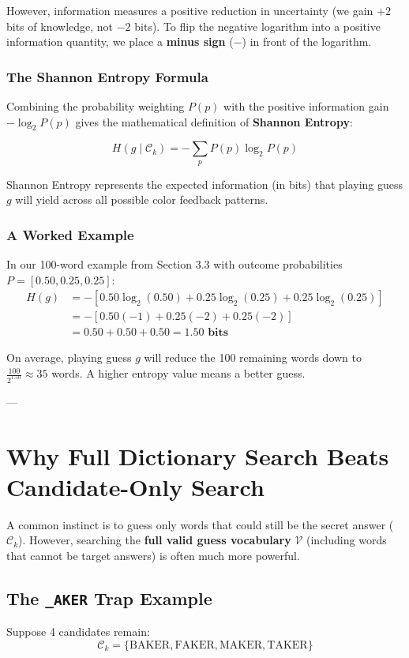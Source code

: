 \documentclass[11pt,a4paper]{article}
\begin{document}
However, information measures a positive reduction in uncertainty (we gain $+2$ bits of knowledge, not $-2$ bits). To flip the negative logarithm into a positive information quantity, we place a \textbf{minus sign} ($-$) in front of the logarithm.

\subsubsection*{The Shannon Entropy Formula}
Combining the probability weighting $P(p)$ with the positive information gain $-\log_2 P(p)$ gives the mathematical definition of \textbf{Shannon Entropy}:

\begin{equation}
H(g \mid \mathcal{C}_k) = -\sum_{p} P(p) \log_2 P(p)
\end{equation}

Shannon Entropy represents the expected information (in bits) that playing guess $g$ will yield across all possible color feedback patterns.

\subsubsection*{A Worked Example}
In our 100-word example from Section 3.3 with outcome probabilities $P = [0.50, 0.25, 0.25]$:
\begin{align*}
H(g) &= - \left[ 0.50 \log_2(0.50) + 0.25 \log_2(0.25) + 0.25 \log_2(0.25) \right] \\
&= - \left[ 0.50(-1) + 0.25(-2) + 0.25(-2) \right] \\
&= 0.50 + 0.50 + 0.50 = \mathbf{1.50 \text{ bits}}
\end{align*}

On average, playing guess $g$ will reduce the 100 remaining words down to $\frac{100}{2^{1.50}} \approx 35$ words. A higher entropy value means a better guess.

---

\section{Why Full Dictionary Search Beats Candidate-Only Search}

A common instinct is to guess only words that could still be the secret answer ($\mathcal{C}_k$). However, searching the \textbf{full valid guess vocabulary} $\mathcal{V}$ (including words that cannot be target answers) is often much more powerful.

\subsection{The \texttt{\_AKER} Trap Example}
Suppose 4 candidates remain:
$$\mathcal{C}_k = \{ \text{BAKER}, \text{FAKER}, \text{MAKER}, \text{TAKER} \}$$
\end{document}

